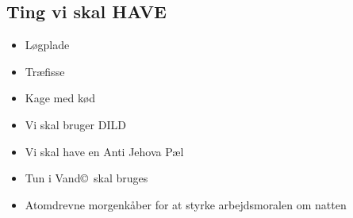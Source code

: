 \subsection{Ting vi skal HAVE}
\begin{itemize}
\item Løgplade
\item Træfisse
\item Kage med kød
\item Vi skal bruger DILD\cite{bib:url:Reklame:Dild}
\item Vi skal have en Anti Jehova Pæl\texttrademark \cite{bib:url:Reklame:Anti}
\item Tun i Vand\copyright \, skal bruges \cite{bib:url:Reklame:Tun} 
\item Atomdrevne morgenkåber for at styrke arbejdsmoralen om natten \cite{bib:url:Reklame:Atom}
\end{itemize}